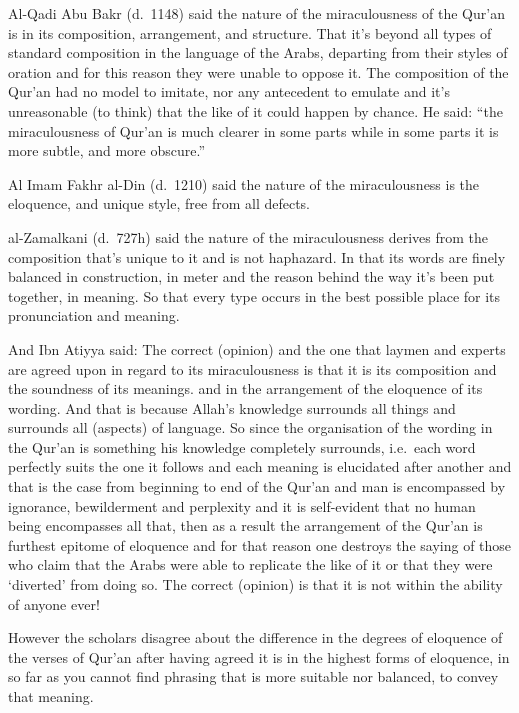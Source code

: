 \documentclass[12pt]{book}
\begin{document}
Al-Qadi Abu Bakr (d.\ 1148) said the nature of the miraculousness of the Qur’an
is in its composition, arrangement, and structure. That it’s beyond all types
of standard composition in the language of the Arabs, departing from their
styles of oration and for this reason they were unable to oppose it. The
composition of the Qur’an had no model to imitate, nor any antecedent to
emulate and it’s unreasonable (to think) that the like of it could happen by
chance. He said: “the miraculousness of Qur’an is much clearer in some parts
while in some parts it is more subtle, and more obscure.”\footnotemark


Al Imam Fakhr al-Din (d.\ 1210) said the nature of the miraculousness is the
eloquence, and unique style, free from all defects.

al-Zamalkani (d.\ 727h) said the nature of the miraculousness derives from the
composition that’s unique to it and is not haphazard. In that its words are
finely balanced in construction, in meter and the reason behind the way it’s
been put together, in meaning. So that every type occurs in the best possible
place for its pronunciation and meaning.

And Ibn Atiyya said: The correct (opinion) and the one that laymen and experts
are agreed upon in regard to its miraculousness is that it is its composition
and the soundness of its meanings. and in the arrangement of the eloquence of
its wording. And that is because Allah’s knowledge surrounds all things and
surrounds all (aspects) of language. So since the organisation of the wording
in the Qur’an is something his knowledge completely surrounds, i.e.\ each word
perfectly suits the one it follows and each meaning is elucidated after another
and that is the case from beginning to end of the Qur’an and man is encompassed
by ignorance, bewilderment and perplexity and it is self-evident that no human
being encompasses all that, then as a result the arrangement of the Qur’an is
furthest epitome of eloquence and for that reason one destroys the saying of
those who claim that the Arabs were able to replicate the like of it or that
they were ‘diverted’ from doing so. The correct (opinion) is that it is not
within the ability of anyone ever!\footnotemark


However the scholars disagree about the difference in the degrees of eloquence
of the verses of Qur’an after having agreed it is in the highest forms of
eloquence, in so far as you cannot find phrasing that is more suitable nor
balanced, to convey that meaning.
\end{document}
